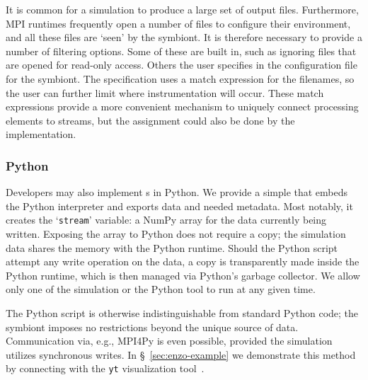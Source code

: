 It is common for a simulation to produce a large set of output
files.  Furthermore, MPI runtimes frequently open a number of files
to configure their environment, and all these files are `seen' by the
symbiont.  It is therefore necessary to provide a number of filtering
options.  Some of these are built in, such as ignoring files that
are opened for read-only access.  Others the user specifies in the
configuration file for the symbiont.  The specification uses a match
expression for the filenames, so the user can further limit where
instrumentation will occur.  These match expressions provide a more
convenient mechanism to uniquely connect processing elements to
streams, but the
assignment could also be done by the \freeprocessor{} implementation.

\subsubsection{Python}
\label{sec:python}

Developers may also implement \freeprocessor{}s in Python.  We provide a simple
\freeprocessor{} that embeds the Python interpreter and exports data
and needed metadata.  Most notably, it creates the
`\texttt{stream}' variable: a NumPy array for the data currently being
written.  Exposing the array to Python does not require a copy; the
simulation data shares the memory with the Python runtime.  Should
the Python script attempt any write operation on the data, a copy is
transparently made inside the Python runtime, which is then managed via
Python's garbage collector.  We allow only one of the simulation or the
Python tool to run at any given time.

The Python script is otherwise indistinguishable from standard Python
code; the symbiont imposes no restrictions beyond the unique source of
data.  Communication via, e.g., MPI4Py is even possible, provided the
simulation utilizes synchronous writes.
In \S~\ref{sec:enzo-example} we demonstrate this method by connecting
\freeprocessing{} with the \texttt{yt}
visualization tool~\cite{Turk:2010:yt}.


